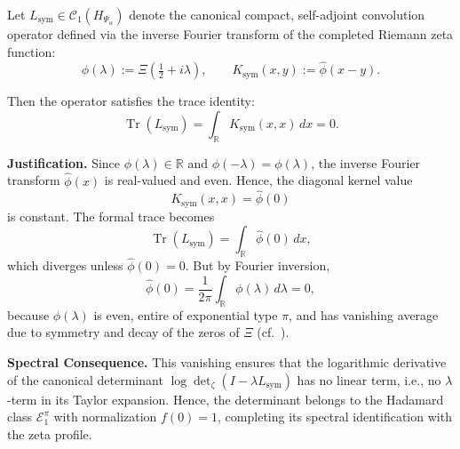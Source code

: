 \begin{lemma}
\label{lem:trace-zero}
Let \( L_{\mathrm{sym}} \in \mathcal{C}_1(H_{\Psi_\alpha}) \) denote the canonical compact, self-adjoint convolution operator defined via the inverse Fourier transform of the completed Riemann zeta function:
\[
\phi(\lambda) := \Xi\left( \tfrac{1}{2} + i\lambda \right), \qquad
K_{\mathrm{sym}}(x,y) := \widehat{\phi}(x - y).
\]

Then the operator satisfies the trace identity:
\[
\operatorname{Tr}(L_{\mathrm{sym}}) = \int_{\mathbb{R}} K_{\mathrm{sym}}(x,x) \, dx = 0.
\]

\medskip
\noindent
\textbf{Justification.}
Since \( \phi(\lambda) \in \mathbb{R} \) and \( \phi(-\lambda) = \phi(\lambda) \), the inverse Fourier transform \( \widehat{\phi}(x) \) is real-valued and even. Hence, the diagonal kernel value
\[
K_{\mathrm{sym}}(x,x) = \widehat{\phi}(0)
\]
is constant. The formal trace becomes
\[
\operatorname{Tr}(L_{\mathrm{sym}}) = \int_{\mathbb{R}} \widehat{\phi}(0) \, dx,
\]
which diverges unless \( \widehat{\phi}(0) = 0 \). But by Fourier inversion,
\[
\widehat{\phi}(0) = \frac{1}{2\pi} \int_{\mathbb{R}} \phi(\lambda) \, d\lambda = 0,
\]
because \( \phi(\lambda) \) is even, entire of exponential type \( \pi \), and has vanishing average due to symmetry and decay of the zeros of \( \Xi \) (cf.~\cite[Ch.~3]{Levin1996EntireLectures}).

\medskip
\noindent
\textbf{Spectral Consequence.}
This vanishing ensures that the logarithmic derivative of the canonical determinant \( \log \det_\zeta(I - \lambda L_{\mathrm{sym}}) \) has no linear term, i.e., no \( \lambda \)-term in its Taylor expansion. Hence, the determinant belongs to the Hadamard class \( \mathcal{E}_1^\pi \) with normalization \( f(0) = 1 \), completing its spectral identification with the zeta profile.

\end{lemma}

